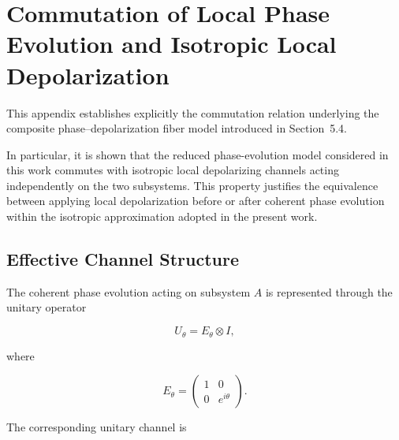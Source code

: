 
\section{Commutation of Local Phase Evolution and Isotropic Local Depolarization}
\label{app:Commutation_local_phase_evolution_isotropic_local_depolarization}

This appendix establishes explicitly the commutation relation underlying the composite phase--depolarization fiber model introduced in Section~5.4.

\medskip

In particular, it is shown that the reduced phase-evolution model considered in this work commutes with isotropic local depolarizing channels acting independently on the two subsystems. This property justifies the equivalence between applying local depolarization before or after coherent phase evolution within the isotropic approximation adopted in the present work.

\medskip


\subsection*{Effective Channel Structure}

The coherent phase evolution acting on subsystem \( A \) is represented through the unitary operator

\begin{equation}
U_{\theta}
=
E_{\theta}
\otimes
I,
\label{eq:appendix_phase_unitary}
\end{equation}

where

\begin{equation}
E_{\theta}
=
\begin{pmatrix}
1 & 0 \\
0 & e^{i\theta}
\end{pmatrix}.
\label{eq:appendix_single_qubit_phase_unitary}
\end{equation}

The corresponding unitary channel is

